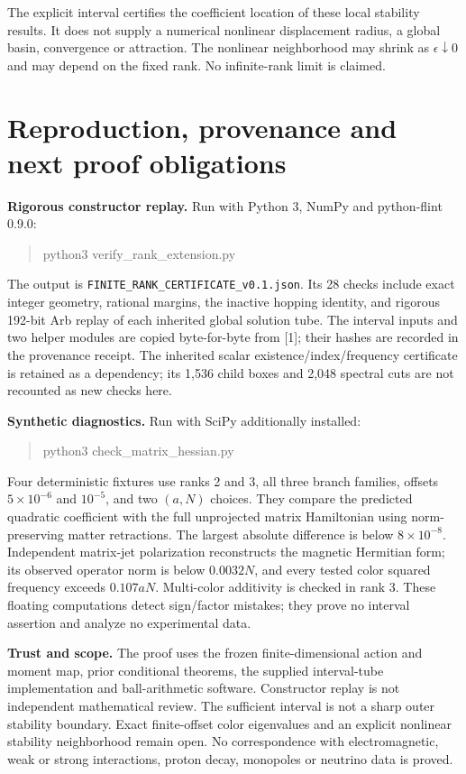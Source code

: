 \documentclass[11pt,a4paper]{article}
\begin{document}
The explicit interval certifies the coefficient location of these local stability results. It does not supply a numerical nonlinear displacement radius, a global basin, convergence or attraction. The nonlinear neighborhood may shrink as $\epsilon\downarrow0$ and may depend on the fixed rank. No infinite-rank limit is claimed.
\newpage
\section{Reproduction, provenance and next proof obligations}
\textbf{Rigorous constructor replay.} Run with Python 3, NumPy and python-flint 0.9.0:
\begin{quote}\ttfamily python3 verify\_rank\_extension.py\end{quote}
The output is \texttt{FINITE\_RANK\_CERTIFICATE\_v0.1.json}. Its 28 checks include exact integer geometry, rational margins, the inactive hopping identity, and rigorous 192-bit Arb replay of each inherited global solution tube. The interval inputs and two helper modules are copied byte-for-byte from [1]; their hashes are recorded in the provenance receipt. The inherited scalar existence/index/frequency certificate is retained as a dependency; its 1,536 child boxes and 2,048 spectral cuts are not recounted as new checks here.

\textbf{Synthetic diagnostics.} Run with SciPy additionally installed:
\begin{quote}\ttfamily python3 check\_matrix\_hessian.py\end{quote}
Four deterministic fixtures use ranks 2 and 3, all three branch families, offsets $5\times10^{-6}$ and $10^{-5}$, and two $(a,N)$ choices. They compare the predicted quadratic coefficient with the full unprojected matrix Hamiltonian using norm-preserving matter retractions. The largest absolute difference is below $8\times10^{-8}$. Independent matrix-jet polarization reconstructs the magnetic Hermitian form; its observed operator norm is below $0.0032N$, and every tested color squared frequency exceeds $0.107aN$. Multi-color additivity is checked in rank 3. These floating computations detect sign/factor mistakes; they prove no interval assertion and analyze no experimental data.

\textbf{Trust and scope.} The proof uses the frozen finite-dimensional action and moment map, prior conditional theorems, the supplied interval-tube implementation and ball-arithmetic software. Constructor replay is not independent mathematical review. The sufficient interval is not a sharp outer stability boundary. Exact finite-offset color eigenvalues and an explicit nonlinear stability neighborhood remain open. No correspondence with electromagnetic, weak or strong interactions, proton decay, monopoles or neutrino data is proved.
\end{document}
